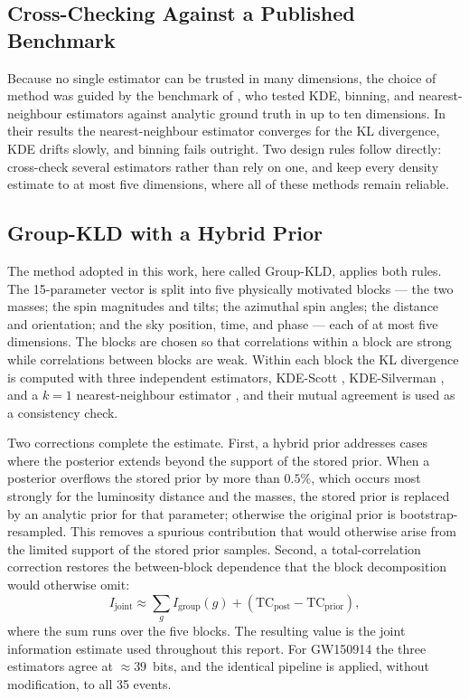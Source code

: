 \documentclass{phys400finalreport}
\begin{document}
\subsection*{Cross-Checking Against a Published Benchmark}

Because no single estimator can be trusted in many dimensions, the choice of
method was guided by the benchmark of \citet{alvarezchaves2024}, who tested
KDE, binning, and nearest-neighbour estimators against analytic ground truth in
up to ten dimensions. In their results the nearest-neighbour estimator
converges for the KL divergence, KDE drifts slowly, and binning fails outright.
Two design rules follow directly: cross-check several estimators rather than
rely on one, and keep every density estimate to at most five dimensions, where
all of these methods remain reliable.

\subsection*{Group-KLD with a Hybrid Prior}

The method adopted in this work, here called Group-KLD, applies both rules. The
15-parameter vector is split into five physically motivated blocks --- the two
masses; the spin magnitudes and tilts; the azimuthal spin angles; the distance
and orientation; and the sky position, time, and phase --- each of at most five
dimensions. The blocks are chosen so that correlations within a block are
strong while correlations between blocks are weak. Within each block the KL
divergence is computed with three independent estimators, KDE-Scott
\citep{scott1992}, KDE-Silverman \citep{silverman1986}, and a $k=1$
nearest-neighbour estimator \citep{Perez-Cruz2008, Wang2009}, and their mutual
agreement is used as a consistency check.

Two corrections complete the estimate. First, a hybrid prior addresses cases
where the posterior extends beyond the support of the stored prior. When a
posterior overflows the stored prior by more than $0.5\%$, which occurs most
strongly for the luminosity distance and the masses, the stored prior is
replaced by an analytic prior for that parameter; otherwise the original prior
is bootstrap-resampled. This removes a spurious contribution that would
otherwise arise from the limited support of the stored prior samples. Second, a
total-correlation correction restores the between-block dependence that the
block decomposition would otherwise omit:
\begin{equation}
I_\mathrm{joint} \approx \sum_{g} I_\mathrm{group}(g) + \left(\mathrm{TC}_\mathrm{post} - \mathrm{TC}_\mathrm{prior}\right),
\label{eq:group_kld}
\end{equation}
where the sum runs over the five blocks. The resulting value is the joint
information estimate used throughout this report. For GW150914 the three
estimators agree at $\approx\!39$~bits, and the identical pipeline is applied,
without modification, to all 35 events.
\end{document}
